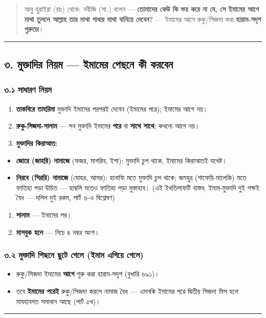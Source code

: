 \begin{quote}
আবু হুরাইরা (রাঃ) থেকে: নবীজি (সা.) বলেন — \textbf{তোমাদের কেউ কি ভয় করে না যে, সে ইমামের আগে মাথা তুললে আল্লাহ তার মাথা গাধার মাথা বানিয়ে দেবেন?} — ইমামের আগে রুকু/সিজদা করা \textbf{হারাম-সদৃশ গুরুতর}।
\end{quote}

\medskip\hrule\medskip

\subsection*{৩. মুক্তাদির নিয়ম — ইমামের পেছনে কী করবেন}

\subsubsection*{৩.১ সাধারণ নিয়ম}

\begin{enumerate}
\item \textbf{তাকবিরে তাহরিমা} মুক্তাদি ইমামের পরপরই দেবেন (ইমামের পরে); ইমামের আগে নয়।
\item \textbf{রুকু-সিজদা-সালাম} — সব মুক্তাদি ইমামের \textbf{পরে} বা \textbf{সাথে সাথে}; কখনো আগে নয়।
\item \textbf{মুক্তাদির কিরাআত:}
\end{enumerate}
\begin{itemize}
\item \textbf{জোরে (জাহরি) নামাজে} (ফজর, মাগরিব, ইশা): মুক্তাদি চুপ থাকে, ইমামের কিরাআতই যথেষ্ট।
\item \textbf{নিরবে (সিররি) নামাজে} (যোহর, আসর): হানাফি মতে মুক্তাদি চুপ থাকে; জমহুর (শাফেয়ি-মালেকি) মতে ফাতিহা পড়া উচিত — হাম্বলি মতেও ফাতিহা পড়া মুস্তাহাব। (এই ইখতিলাফটি বাস্তব; ইমাম-মুক্তাদি দুই পক্ষই বৈধ — দলিল দুই রকম, পার্ট ৬-এ বিশ্লেষণ)
\end{itemize}
\begin{enumerate}
\item \textbf{সালাম} — ইমামের পর।
\item \textbf{মাসবুক হলে} — নিচে ৪ নম্বর অংশ।
\end{enumerate}
\subsubsection*{৩.২ মুক্তাদি পিছনে ছুটে গেলে (ইমাম এগিয়ে গেলে)}

\begin{itemize}
\item রুকু/সিজদা ইমামের \textbf{আগে} শুরু করা হারাম-সদৃশ (বুখারি ৬৯১)।
\item তবে \textbf{ইমামের পরেই} রুকু/সিজদা করলে নামাজ বৈধ — এমনকি ইমামের পরে দ্বিতীয় সিজদা মিস হলে মাযহাবগত সমাধান আছে (পার্ট ৫খ)।
\end{itemize}
\medskip\hrule\medskip

